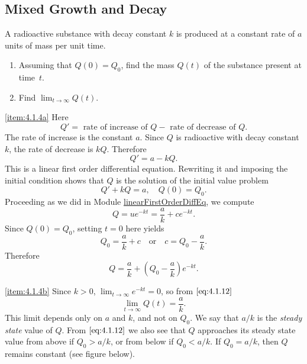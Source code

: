 \documentclass{ximera}
\begin{document}
\subsection*{Mixed Growth and Decay}

\begin{example}\label{example:4.1.4}
A radioactive substance with decay constant $k$ is produced at a
constant rate of $a$ units of mass per unit time.
\begin{enumerate}
\item \label{item:4.1.4a}%
Assuming that $Q(0)=Q_0$, find the mass $Q(t)$ of the
substance present at time~$t$.

\item \label{item:4.1.4b}%
Find $\lim_{t\rightarrow\infty} Q(t)$.
\end{enumerate}
\begin{explanation}
\ref{item:4.1.4a}  Here
$$
Q'=\mbox{ rate of increase of } Q - \mbox{ rate of decrease
of } Q.
$$
The rate of increase is the constant $a$. Since $Q$ is radioactive
with decay constant $k$, the rate of decrease is $kQ$. Therefore
$$
Q'=a-kQ.
$$
This is a linear first order differential equation. Rewriting it and
imposing the initial condition shows that $Q$ is the solution of the
initial value problem
\begin{equation}  \label{eq:4.1.11}
Q'+kQ=a, \quad Q(0)=Q_0.
\end{equation}
Proceeding as we did in Module \href{https://ximera.osu.edu/ode/main/linearFirstOrderDiffEq/linearFirstOrderDiffEq}{linearFirstOrderDiffEq}, we compute $$Q=ue^{-kt}=\frac{a}{k}+ce^{-kt}.$$
 Since $Q(0)=Q_0$, setting $t=0$ here yields
$$Q_0=\frac{a}{k}+c  \quad\mbox{or}\quad c=Q_0-\frac{a}{k}.$$
 Therefore
\begin{equation} \label{eq:4.1.12}
Q=\frac{a}{k}+\left(Q_0-\frac{a}{k}\right)e^{-kt}.
\end{equation}

\ref{item:4.1.4b}
Since $k > 0$,  $\lim_{t\rightarrow\infty} e^{-kt}=0$, so
from $\eqref{eq:4.1.12}$
$$
\lim_{t\rightarrow\infty} Q(t)=\frac{a}{k}.
$$
This limit depends only on $a$ and $k$, and not on $Q_0$.
We say that $a/k$ is the \textit{steady state} value of $Q$. From
$\eqref{eq:4.1.12}$ we also see that $Q$ approaches its steady state value
from above if $Q_0 > a/k$, or from below if $Q_0 < a/k$. If $Q_0=a/k$,
then $Q$ remains constant (see figure below).

\begin{center}
\end{center}


\end{explanation}
\end{example}
\end{document}
